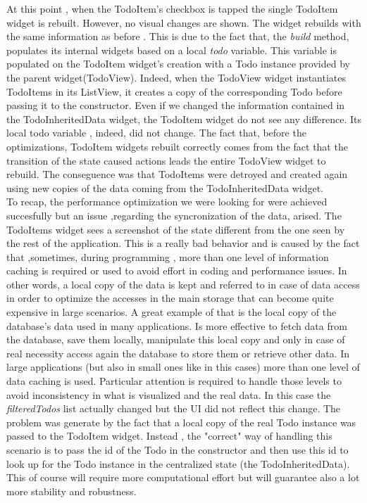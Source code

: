 At this point , when the TodoItem’s checkbox is tapped the single TodoItem widget is rebuilt. However, no visual changes are shown. The widget rebuilds with the same information as before . This is due to the fact that, the \textit{build} method, populates its internal widgets based on a local \textit{todo} variable. This variable is populated on the TodoItem widget's creation with a Todo instance provided by the parent widget(TodoView). Indeed, when the TodoView widget instantiates TodoItems  in its ListView, it creates a copy of the corresponding Todo before passing it to the constructor. Even if we changed the information contained in the TodoInheritedData widget, the TodoItem widget do not see any difference.  Its local todo variable , indeed, did not change. The fact that, before the optimizations, TodoItem widgets rebuilt correctly comes from the fact that the transition of the state caused actions leads the entire TodoView widget to rebuild. The conseguence was that TodoItems were detroyed and created again using new copies of the data coming from the TodoInheritedData widget. \\
To recap, the performance optimization we were looking for were achieved succesfully but an issue ,regarding the syncronization of the data, arised. The TodoItems widget sees a screenshot of the state different from the one seen by the rest of the application. This is a really bad behavior and is caused by the fact that ,sometimes, during programming , more than one level of information caching is required or used to avoid effort in coding and performance issues. In other words, a local copy of the data is kept and referred to in case of data access in order to optimize the accesses in the main storage that can become quite expensive in large scenarios. A great example of that is the local copy of the database’s data used in many applications. Is more effective to fetch data from the database, save them locally, manipulate this local copy and only in case of real necessity access again the database to store them or retrieve other data. In large applications (but also in small ones like in this cases) more than one level of data caching is used. Particular attention is required to handle those levels to avoid inconsistency in what is visualized and the real data. In this case the \textit{filteredTodos} list actually changed but the UI did not reflect this change. The problem was generate by the fact that a local copy of the real Todo instance was passed to the TodoItem widget. Instead , the "correct" way of handling this scenario is to pass the id of the Todo in the constructor and then use this id to look up for the Todo instance in the centralized state (the TodoInheritedData). This of course will require more computational effort but  will guarantee also a lot more stability and robustness. 
